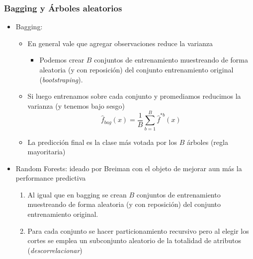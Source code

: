 \documentclass[leqno, 10pt, envcountsect]{beamer}
\numberwithin{equation}{section}
\theoremstyle{definition}
\theoremstyle{example}
\numberwithin{figure}{section}
\numberwithin{table}{section}
\let\olditem\item
\renewcommand{\item}{%
\olditem\vspace{1pt}}
\begin{document}
\begin{frame}[fragile=singleslide]
  \frametitle{Bagging y Árboles aleatorios}
  \begin{itemize}
    \item Bagging:
      \begin{itemize}
        \item En general vale que agregar observaciones reduce la varianza
          \begin{itemize}
            \item Podemos crear $B$ conjuntos de entrenamiento muestreando de forma
              aleatoria (y con reposición) del conjunto entrenamiento original
              (\textit{bootstraping}).
              \end{itemize}
            \item Si luego entrenamos sobre cada conjunto y promediamos
              reducimos la varianza (y tenemos bajo sesgo)
              \begin{equation*}
                \hat{f}_{bag}(x) = \frac{1}{B}\sum_{b=1}^{B}\hat{f}^{*b}(x)
              \end{equation*}
            \item La predicción final es la clase más votada por los $B$
              árboles (regla mayoritaria)
      \end{itemize}
    \item Random Forests: ideado por Breiman con el objeto de mejorar
      aun más la performance predictiva
      \begin{enumerate}
        \item Al igual que en bagging se crean $B$ conjuntos de entrenamiento muestreando de forma
          aleatoria (y con reposición) del conjunto entrenamiento original.
        \item Para cada conjunto se hacer particionamiento recursivo pero al
          elegir los cortes se emplea un subconjunto aleatorio de la totalidad
          de atributos (\textit{descorrelacionar})
      \end{enumerate}
  \end{itemize}
\end{frame}
\end{document}

